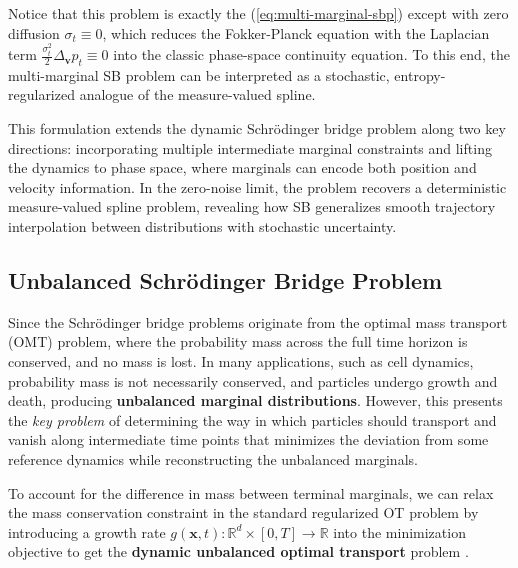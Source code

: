 \documentclass{article}
\newcommand{\boldtext}[1]{\textbf{\textcolor{MyGreen}{#1}}}
\begin{document}
{Notice that this problem is exactly the (\ref{eq:multi-marginal-sbp}) except with zero diffusion $\sigma_t\equiv 0$, which reduces the Fokker-Planck equation with the Laplacian term $\frac{\sigma_t^2}{2}\Delta_{\boldsymbol{v}}p_t\equiv 0$ into the classic phase-space continuity equation. To this end, the multi-marginal SB problem can be interpreted as a stochastic, entropy-regularized analogue of the measure-valued spline.
}

This formulation extends the dynamic Schrödinger bridge problem along two key directions: incorporating multiple intermediate marginal constraints and lifting the dynamics to phase space, where marginals can encode both position and velocity information. In the zero-noise limit, the problem recovers a deterministic measure-valued spline problem, revealing how SB generalizes smooth trajectory interpolation between distributions with stochastic uncertainty. 

\subsection{Unbalanced Schrödinger Bridge Problem}
\label{subsec:unbalanced-sbp}
Since the Schrödinger bridge problems originate from the optimal mass transport (OMT) problem, where the probability mass across the full time horizon is conserved, and no mass is lost. In many applications, such as cell dynamics, probability mass is not necessarily conserved, and particles undergo growth and death, producing \textbf{unbalanced marginal distributions}. However, this presents the \textit{key problem} of determining the way in which particles should transport and vanish along intermediate time points that minimizes the deviation from some reference dynamics while reconstructing the unbalanced marginals.

To account for the difference in mass between terminal marginals, we can relax the mass conservation constraint in the standard regularized OT problem by introducing a growth rate $g(\boldsymbol{x},t): \mathbb{R}^d\times[0,T]\to \mathbb{R}$ into the minimization objective to get the \boldtext{dynamic unbalanced optimal transport} problem \citep{chizat2018interpolating, chizat2018unbalanced}.
\end{document}
